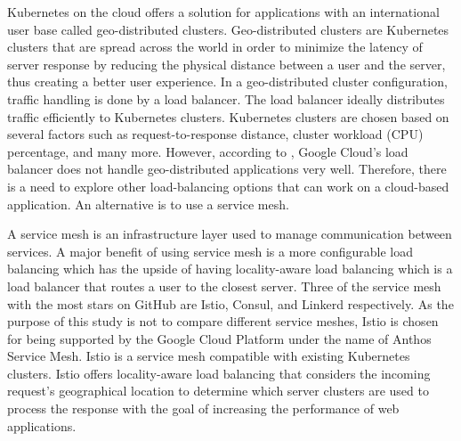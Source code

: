Kubernetes on the cloud offers a solution for applications with an international user base called geo-distributed clusters. Geo-distributed clusters are Kubernetes clusters that are spread across the world in order to minimize the latency of server response by reducing the physical distance between a user and the server, thus creating a better user experience. In a geo-distributed cluster configuration, traffic handling is done by a load balancer. The load balancer ideally distributes traffic efficiently to Kubernetes clusters. Kubernetes clusters are chosen based on several factors such as request-to-response distance, cluster workload (CPU) percentage, and many more. However, according to \citet{andrew-2023}, Google Cloud's load balancer does not handle geo-distributed applications very well. Therefore, there is a need to explore other load-balancing options that can work on a cloud-based application. An alternative is to use a service mesh.




A service mesh is an infrastructure layer used to manage communication between services. A major benefit of using service mesh is a more configurable load balancing which has the upside of having locality-aware load balancing which is a load balancer that routes a user to the closest server. Three of the service mesh with the most stars on GitHub are Istio, Consul, and Linkerd respectively. As the purpose of this study is not to compare different service meshes, Istio is chosen for being supported by the Google Cloud Platform under the name of Anthos Service Mesh. Istio is a service mesh compatible with existing Kubernetes clusters. Istio offers locality-aware load balancing that considers the incoming request's geographical location to determine which server clusters are used to process the response with the goal of increasing the performance of web applications.

